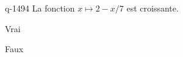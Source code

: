 \begin{truefalse}{q-1494}
La fonction $x\mapsto 2-x/7$ est croissante.
\item Vrai
\item* Faux
\end{truefalse}

